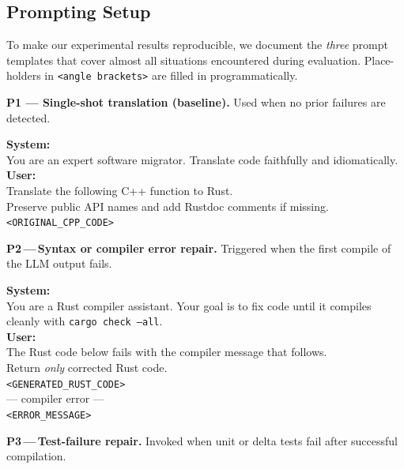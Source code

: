 \documentclass[twocolumn]{article}
\begin{document}
    \subsection{Prompting Setup}
    \label{subsec:prompts}
    
    To make our experimental results reproducible, we document the
    \emph{three} prompt templates that cover almost all situations
    encountered during evaluation.  Place-holders in
    \texttt{\textless angle\,brackets\textgreater} are filled in
    programmatically.
    
    \noindent\textbf{P1 — Single-shot translation (baseline).}
    Used when no prior failures are detected.
    
    \begin{tcolorbox}
    \small
    \textbf{System:}\\
    You are an expert software migrator. Translate code faithfully and idiomatically.\\[2pt]
    \textbf{User:}\\
    Translate the following C++ function to Rust.\\
    Preserve public API names and add Rustdoc comments if missing.\\[6pt]
    \texttt{\textless ORIGINAL\_CPP\_CODE\textgreater}
    \end{tcolorbox}
    
    \noindent\textbf{P2\,---\,Syntax or compiler error repair.}
    Triggered when the first compile of the LLM output fails.
    
    \begin{tcolorbox}
    \small
    \textbf{System:}\\
    You are a Rust compiler assistant.  Your goal is to fix code until it
    compiles cleanly with \texttt{cargo check --all}.\\[2pt]
    \textbf{User:}\\
    The Rust code below fails with the compiler message that follows.\\
    Return \emph{only} corrected Rust code.\\[6pt]
    \texttt{\textless GENERATED\_RUST\_CODE\textgreater}\\[4pt]
    --- compiler error ---\\
    \texttt{\textless ERROR\_MESSAGE\textgreater}
    \end{tcolorbox}
    
    \noindent\textbf{P3\,---\,Test-failure repair.}
    Invoked when unit or delta tests fail after successful compilation.
    
\end{document}
